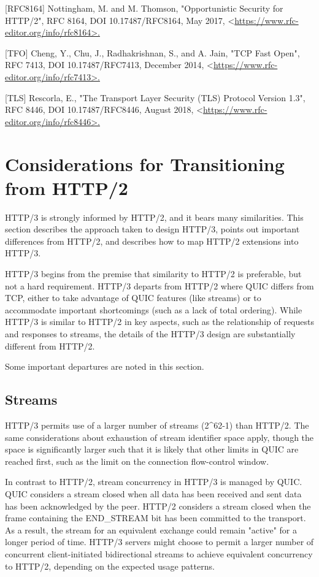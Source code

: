 \documentclass{article}
\begin{document}
[RFC8164]  Nottingham, M. and M. Thomson, "Opportunistic Security for HTTP/2", RFC 8164, DOI 10.17487/RFC8164, May 2017, <\url{https://www.rfc-editor.org/info/rfc8164>.}

[TFO]      Cheng, Y., Chu, J., Radhakrishnan, S., and A. Jain, "TCP Fast Open", RFC 7413, DOI 10.17487/RFC7413, December 2014, <\url{https://www.rfc-editor.org/info/rfc7413>.}

[TLS]      Rescorla, E., "The Transport Layer Security (TLS) Protocol Version 1.3", RFC 8446, DOI 10.17487/RFC8446, August 2018, <\url{https://www.rfc-editor.org/info/rfc8446>.}

\section{Considerations for Transitioning from HTTP/2}

HTTP/3 is strongly informed by HTTP/2, and it bears many similarities.  This section describes the approach taken to design HTTP/3, points out important differences from HTTP/2, and describes how to map HTTP/2 extensions into HTTP/3.

HTTP/3 begins from the premise that similarity to HTTP/2 is preferable, but not a hard requirement.  HTTP/3 departs from HTTP/2 where QUIC differs from TCP, either to take advantage of QUIC features (like streams) or to accommodate important shortcomings (such as a lack of total ordering).  While HTTP/3 is similar to HTTP/2 in key aspects, such as the relationship of requests and responses to streams, the details of the HTTP/3 design are substantially different from HTTP/2.

Some important departures are noted in this section.

\subsection{Streams}

HTTP/3 permits use of a larger number of streams (2\textasciicircum{}62-1) than HTTP/2.  The same considerations about exhaustion of stream identifier space apply, though the space is significantly larger such that it is likely that other limits in QUIC are reached first, such as the limit on the connection flow-control window.

In contrast to HTTP/2, stream concurrency in HTTP/3 is managed by QUIC.  QUIC considers a stream closed when all data has been received and sent data has been acknowledged by the peer.  HTTP/2 considers a stream closed when the frame containing the END\_STREAM bit has been committed to the transport.  As a result, the stream for an equivalent exchange could remain "active" for a longer period of time.  HTTP/3 servers might choose to permit a larger number of concurrent client-initiated bidirectional streams to achieve equivalent concurrency to HTTP/2, depending on the expected usage patterns.
\end{document}
